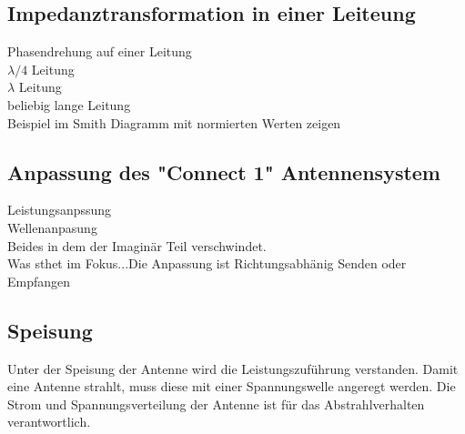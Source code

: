 \subsection{Impedanztransformation in einer Leiteung}
Phasendrehung auf einer Leitung\\
$\lambda/4$ Leitung\\
$\lambda$ Leitung\\
beliebig lange Leitung\\
Beispiel im Smith Diagramm mit normierten Werten zeigen
\subsection{Anpassung des "Connect 1" Antennensystem}
Leistungsanpssung\\
Wellenanpasung\\
Beides in dem der  Imaginär Teil verschwindet.\\
Was sthet im Fokus...Die Anpassung ist Richtungsabhänig
Senden oder Empfangen





\subsection{Speisung}
Unter der Speisung der Antenne wird die Leistungszuführung verstanden. Damit eine Antenne strahlt, muss diese mit einer Spannungswelle angeregt werden. Die Strom und Spannungsverteilung der Antenne ist für das Abstrahlverhalten verantwortlich. 


